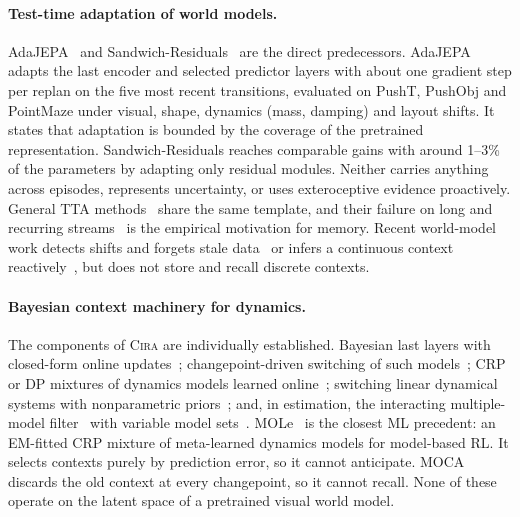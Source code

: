 \documentclass[10pt]{article}
\newcommand{\method}{\textsc{Cira}}
\begin{document}
\paragraph{Test-time adaptation of world models.}
AdaJEPA~\cite{wang2026adajepa} and Sandwich-Residuals~\cite{soni2026sandwich} are the direct
predecessors. AdaJEPA adapts the last encoder and selected predictor layers with about one gradient step
per replan on the five most recent transitions, evaluated on PushT, PushObj and PointMaze under
visual, shape, dynamics (mass, damping) and layout shifts. It states that adaptation is bounded by the
coverage of the pretrained representation. Sandwich-Residuals reaches comparable gains with around
1--3\% of the parameters by adapting only residual modules. Neither carries anything across episodes,
represents uncertainty, or uses exteroceptive evidence proactively. General TTA
methods~\cite{sun2020ttt,wang2021tent,wang2022cotta} share the same template, and their failure on
long and recurring streams~\cite{press2023rdumb,hoang2024petta} is the empirical motivation for
memory. Recent world-model work detects shifts and forgets stale data~\cite{yang2026cawm} or infers a
continuous context reactively~\cite{roder2025dali,benad2026dmash}, but does not store and recall
discrete contexts.

\paragraph{Bayesian context machinery for dynamics.}
The components of \method{} are individually established. Bayesian last layers with closed-form online
updates~\cite{harrison2018alpaca,harrison2024vbll}; changepoint-driven switching of such
models~\cite{harrison2020moca,adams2007bocpd}; CRP or DP mixtures of dynamics models learned
online~\cite{nagabandi2019mole,xu2020taskagnostic,jerfel2019reconciling,lee2020cndpm}; switching
linear dynamical systems with nonparametric priors~\cite{fox2011bnpslds,fox2011sticky,linderman2017rslds};
and, in estimation, the interacting multiple-model filter~\cite{blom1988imm,mazor1998imm} with
variable model sets~\cite{li1996vsmm}. MOLe~\cite{nagabandi2019mole} is the closest ML precedent: an
EM-fitted CRP mixture of meta-learned dynamics models for model-based RL. It selects contexts purely
by prediction error, so it cannot anticipate. MOCA~\cite{harrison2020moca} discards the old context at
every changepoint, so it cannot recall. None of these operate on the latent space of a pretrained
visual world model.
\end{document}
